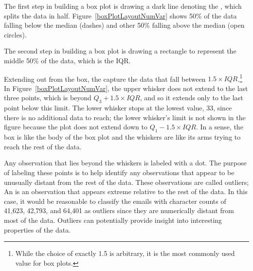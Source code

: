 \begin{doublespace}
The first step in building a box plot is drawing a dark line denoting the , which splits the data in half. Figure~\ref{boxPlotLayoutNumVar} shows 50\% of the data falling below the median (dashes) and other 50\% falling above the median (open circles). 

The second step in building a box plot is drawing a rectangle to represent the middle 50\% of the data, which is the IQR.

Extending out from the box, the  capture the data that fall between $1.5\times IQR$.\footnote{While the choice of exactly 1.5 is arbitrary, it is the most commonly used value for box plots.} In Figure~\ref{boxPlotLayoutNumVar}, the upper whisker does not extend to the last three points, which is beyond $Q_3 + 1.5\times IQR$, and so it extends only to the last point below this limit. The lower whisker stops at the lowest value, 33, since there is no additional data to reach; the lower whisker's limit is not shown in the figure because the plot does not extend down to $Q_1 - 1.5\times IQR$. In a sense, the box is like the body of the box plot and the whiskers are like its arms trying to reach the rest of the data.

Any observation that lies beyond the whiskers is labeled with a dot. The purpose of labeling these points is to help identify any observations that appear to be unusually distant from the rest of the data. These observations are called outliers; An  is an observation that appears extreme relative to the rest of the data. In this case, it would be reasonable to classify the emails with character counts of 41,623, 42,793, and 64,401 as outliers since they are numerically distant from most of the data. Outliers can potentially provide insight into interesting properties of the data. 


\end{doublespace}
